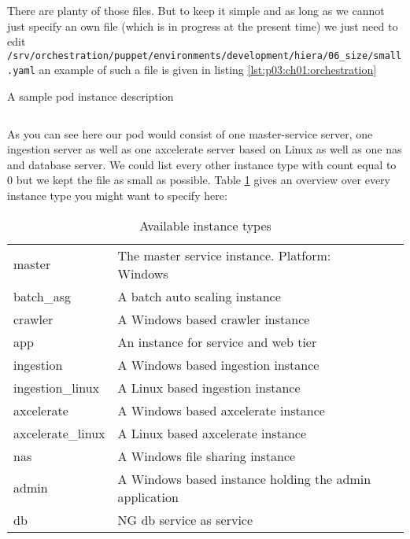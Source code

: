 	There are planty of those files. But to keep it simple and as long as we cannot just specify an own file (which is in progress at the present time) we just need to edit \texttt{/srv/orchestration/puppet/environments/development/hiera/06_size/small.yaml} an example of such a file is given in listing \ref{lst:p03:ch01:orchestration}
	\begin{listing}[H]
		\caption{A sample pod instance description}
		\label{lst:p03:ch01:orchestration}
		\inputminted{yaml}{\relative{chapter_00/section_1.4/pod_instance_description.yaml}}
	\end{listing}
	As you can see here our pod would consist of one master-service server, one ingestion server as well as one axcelerate server based on Linux as well as one nas and database server. We could list every other instance type with count equal to $0$ but we kept the file as small as possible. Table \ref{tab:p03:ch01:instance_types} gives an overview over every instance type you might want to specify here:
	\begin{table}[h]
         \center
         \caption{Available instance types}
         \begin{tabular}{| l | l | l |}
           \hline
           \thead{Instance type} & \thead{Remark} \\ \hline
           master & The master service instance. Platform: Windows \\ \hline
           batch\_asg & A batch auto scaling instance \\ \hline
           crawler & A Windows based crawler instance \\ \hline
           app & An instance for service and web tier \\ \hline
           ingestion & A Windows based ingestion instance \\ \hline
           ingestion\_linux & A Linux based ingestion instance \\ \hline
           axcelerate & A Windows based axcelerate instance \\ \hline
           axcelerate\_linux & A Linux based axcelerate instance \\ \hline
           nas & A Windows file sharing instance \\ \hline
           admin & A Windows based instance holding the admin application \\ \hline
           db & NG db service as \aws{} service \\ \hline
         \end{tabular}
         \label{tab:p03:ch01:instance_types}
      \end{table}
	
